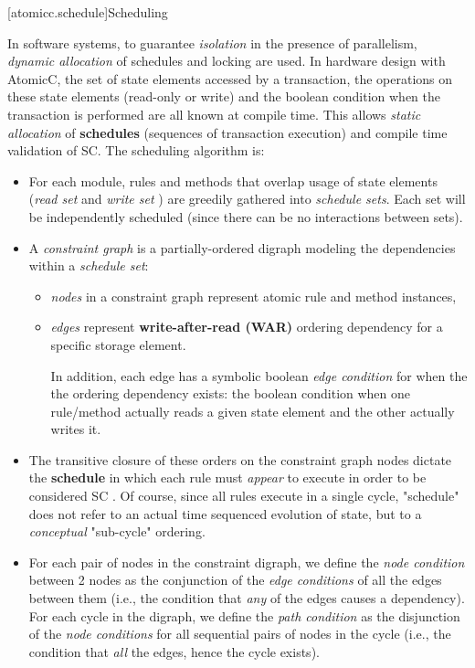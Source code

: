 [atomicc.schedule]{Scheduling}

In software systems, to guarantee \textit{isolation} in the presence of
parallelism, \textit{dynamic allocation}\cite[p.~377]{GrayR93} of schedules
and locking\cite[Sec.~11.2]{OV11} are used.
In hardware design with AtomicC,
the set of state elements accessed by a transaction,
the operations on these state elements (read-only or write)
and the boolean condition when the transaction is performed
are all known at compile time.
This allows \textit{static allocation}\cite[Sec.~7.3.1]{GrayR93} of \textbf{schedules}
(sequences of transaction execution)
and compile time validation of SC.
The scheduling algorithm is:
\begin{itemize}
\item For each module, rules and methods that overlap usage of state elements
(\textit{read set} and \textit{write set}\cite[Sec.~10.1.2]{OV11} \cite{RosenkrantzSternsLewis})
are greedily gathered into \textit{schedule sets}.
Each set will be independently scheduled (since
there can be no interactions between sets).
\item A \textit{constraint graph} is a partially-ordered digraph modeling
the dependencies within a \textit{schedule set}:
\begin{itemize}
\item \textit{nodes} in a constraint graph represent atomic rule and method instances,
\item \textit{edges} represent \textbf{write-after-read (WAR)} ordering dependency
for a specific storage element\cite[Sec.~3]{Cain2003}.

In addition, each edge has a symbolic boolean \textit{edge condition} for when the
the ordering dependency exists: the boolean
condition when one rule/method actually reads a given state element
and the other actually writes it.
\end{itemize}

\item The transitive closure of these orders on the constraint graph nodes
dictate the \textbf{schedule} in which each rule must \textit{appear} to execute in
order to be considered SC
\cite[Sec.~11.1]{OV11}.
Of course, since all rules execute in a single cycle, "schedule" does not
refer to an actual time sequenced evolution of state,
but to a \textit{conceptual} "sub-cycle" ordering.

\item For each pair of nodes in the constraint digraph, we define the \textit{node condition}
between 2 nodes as the conjunction of the \textit{edge conditions} of all the edges between
them (i.e., the condition that \textit{any} of the edges causes a dependency).
For each cycle in the digraph, we define the \textit{path condition}
as the disjunction of the \textit{node conditions} for all sequential pairs of nodes
in the cycle (i.e., the condition that \textit{all} the edges, hence the cycle exists).


\end{itemize}

